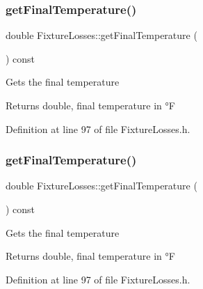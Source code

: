 \mbox{\label{class_fixture_losses_a5c4259a78f78c675b063290f0fe6ea36}} 
\subsubsection{\texorpdfstring{get\+Final\+Temperature()}{getFinalTemperature()}\hspace{0.1cm}{\footnotesize\ttfamily [1/3]}}
{\footnotesize\ttfamily double Fixture\+Losses\+::get\+Final\+Temperature (\begin{DoxyParamCaption}{ }\end{DoxyParamCaption}) const\hspace{0.3cm}{\ttfamily [inline]}}

Gets the final temperature \begin{DoxyReturn}{Returns}
double, final temperature in °F 
\end{DoxyReturn}


Definition at line 97 of file Fixture\+Losses.\+h.

\mbox{\label{class_fixture_losses_a5c4259a78f78c675b063290f0fe6ea36}} 
\subsubsection{\texorpdfstring{get\+Final\+Temperature()}{getFinalTemperature()}\hspace{0.1cm}{\footnotesize\ttfamily [2/3]}}
{\footnotesize\ttfamily double Fixture\+Losses\+::get\+Final\+Temperature (\begin{DoxyParamCaption}{ }\end{DoxyParamCaption}) const\hspace{0.3cm}{\ttfamily [inline]}}

Gets the final temperature \begin{DoxyReturn}{Returns}
double, final temperature in °F 
\end{DoxyReturn}


Definition at line 97 of file Fixture\+Losses.\+h.

\mbox{\label{class_fixture_losses_a5c4259a78f78c675b063290f0fe6ea36}} 
